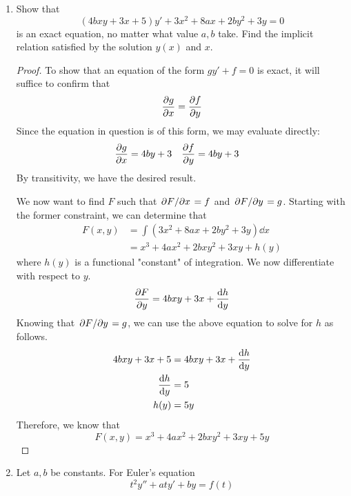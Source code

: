 \documentclass[../psets.tex]{subfiles}
\begin{document}
\begin{enumerate}
    \item Show that
    \begin{equation*}
        (4bxy+3x+5)y'+3x^2+8ax+2by^2+3y = 0
    \end{equation*}
    is an exact equation, no matter what value $a,b$ take. Find the implicit relation satisfied by the solution $y(x)$ and $x$.
    \begin{proof}
        To show that an equation of the form $gy'+f=0$ is exact, it will suffice to confirm that
        \begin{equation*}
            \pdv{g}{x} = \pdv{f}{y}
        \end{equation*}
        Since the equation in question is of this form, we may evaluate directly:
        \begin{align*}
            \pdv{g}{x} &= 4by+3&
            \pdv{f}{y} &= 4by+3
        \end{align*}
        By transitivity, we have the desired result.\par
        We now want to find $F$ such that $\pdv*{F}{x}=f$ and $\pdv*{F}{y}=g$. Starting with the former constraint, we can determine that
        \begin{align*}
            F(x,y) &= \int(3x^2+8ax+2by^2+3y)\dd{x}\\
            &= x^3+4ax^2+2bxy^2+3xy+h(y)
        \end{align*}
        where $h(y)$ is a functional "constant" of integration. We now differentiate with respect to $y$.
        \begin{equation*}
            \pdv{F}{y} = 4bxy+3x+\dv{h}{y}
        \end{equation*}
        Knowing that $\pdv*{F}{y}=g$, we can use the above equation to solve for $h$ as follows.
        \begin{align*}
            4bxy+3x+5 &= 4bxy+3x+\dv{h}{y}\\
            \dv{h}{y} &= 5\\
            h(y) &= 5y
        \end{align*}
        Therefore, we know that
        \begin{equation*}
            \boxed{F(x,y) = x^3+4ax^2+2bxy^2+3xy+5y}
        \end{equation*}
    \end{proof}
    \item Let $a,b$ be constants. For Euler's equation
    \begin{equation*}
        t^2y''+aty'+by = f(t)
    \end{equation*}

\end{enumerate}
\end{document}
